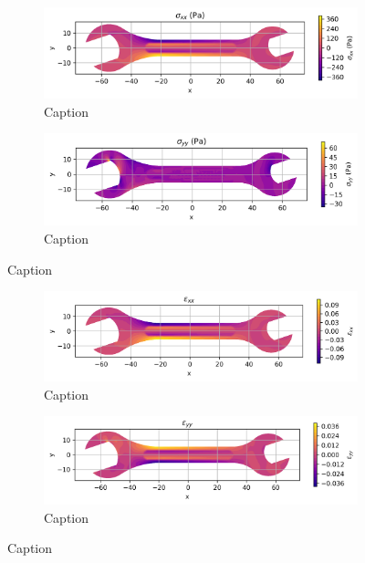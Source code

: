 \documentclass{article}  %
\begin{document}
\begin{figure}[H]
  \centering
  \begin{subfigure}[t]{0.49\textwidth}
    \centering
    \includegraphics[width=\textwidth]{GRAFICOS/Case b - sigma_xx.png}
    \caption{Caption}
    \label{fig:deformada_reacciones}
  \end{subfigure}
  \hfill
  \begin{subfigure}[t]{0.49\textwidth}
    \centering
    \includegraphics[width=\textwidth]{GRAFICOS/Case b - sigma_yy.png}
    \caption{Caption}
    \label{fig:von_mises}
  \end{subfigure}
  \caption{Caption}
  \label{fig:analisis_estructural}
\end{figure}

\begin{figure}[H]
  \centering
  \begin{subfigure}[t]{0.49\textwidth}
    \centering
    \includegraphics[width=\textwidth]{GRAFICOS/Case b - epsilon_xx.png}
    \caption{Caption}
    \label{fig:deformada_reacciones}
  \end{subfigure}
  \hfill
  \begin{subfigure}[t]{0.49\textwidth}
    \centering
    \includegraphics[width=\textwidth]{GRAFICOS/Case b - epsilon_yy.png}
    \caption{Caption}
    \label{fig:von_mises}
  \end{subfigure}
  \caption{Caption}
  \label{fig:analisis_estructural}
\end{figure}
\end{document}
